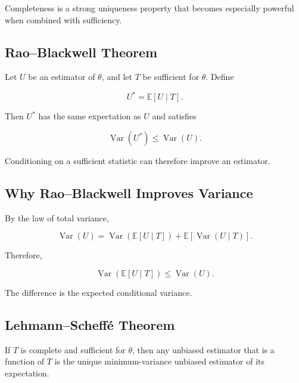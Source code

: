 Completeness is a strong uniqueness property that becomes especially
powerful when combined with sufficiency.

\subsection{Rao--Blackwell Theorem}
\label{subsec:rao-blackwell-theorem}

\begin{theorem}
Let \(U\) be an estimator of \(\theta\), and let \(T\) be sufficient for
\(\theta\). Define

\[
\boxed{
U^*
=
\mathbb{E}[U\mid T].
}
\]

Then \(U^*\) has the same expectation as \(U\) and satisfies

\[
\boxed{
\operatorname{Var}(U^*)
\leq
\operatorname{Var}(U).
}
\]
\end{theorem}

Conditioning on a sufficient statistic can therefore improve an estimator.

\subsection{Why Rao--Blackwell Improves Variance}
\label{subsec:rao-blackwell-variance}

By the law of total variance,

\[
\operatorname{Var}(U)
=
\operatorname{Var}
(
\mathbb{E}[U\mid T]
)
+
\mathbb{E}
[
\operatorname{Var}(U\mid T)
].
\]

Therefore,

\[
\boxed{
\operatorname{Var}
(
\mathbb{E}[U\mid T]
)
\leq
\operatorname{Var}(U).
}
\]

The difference is the expected conditional variance.

\subsection{Lehmann--Scheffé Theorem}
\label{subsec:lehmann-scheffe-theorem}

\begin{theorem}
If \(T\) is complete and sufficient for \(\theta\), then any unbiased
estimator that is a function of \(T\) is the unique minimum-variance
unbiased estimator of its expectation.
\end{theorem}

